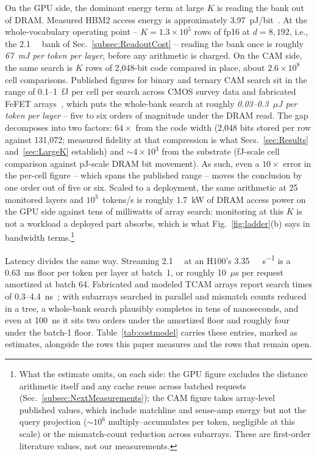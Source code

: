 \documentclass[conference]{IEEEtran}
\newcommand{\cam}{{CAM}\xspace}
\newcommand{\fefet}{{FeFET}\xspace}
\begin{document}
On the GPU side, the dominant energy term at large $K$ is reading the
bank out of DRAM. Measured HBM2 access energy is approximately
3.97~pJ/bit~\cite{oconnor2017fgdram}. At the whole-vocabulary
operating point -- $K=1.3\!\times\!10^{5}$ rows of fp16 at $d=8{,}192$,
i.e., the \qty{2.1}{\giga\byte} bank of
Sec.~\ref{subsec:ReadoutCost} -- reading the bank once is roughly
\emph{67~mJ per token per layer}, before any arithmetic is charged. On
the \cam side, the same search is $K$ rows of 2{,}048-bit code compared
in place, about $2.6\!\times\!10^{8}$ cell comparisons. Published
figures for binary and ternary \cam search sit in the range of
0.1--1~fJ per cell per search across CMOS survey data and fabricated
\fefet arrays~\cite{pagiamtzis2006cam,ni2019fetcam,liu2022evacam},
which puts the whole-bank search at roughly \emph{0.03--0.3~$\mu$J per
token per layer} -- five to six orders of magnitude under the DRAM
read. The gap decomposes into two factors: $64\times$ from the code
width (2{,}048 bits stored per row against 131{,}072; measured
fidelity at that compression is what Secs.~\ref{sec:Results}
and~\ref{sec:LargeK} establish) and $\sim$$4\!\times\!10^{3}$ from the
substrate (fJ-scale cell comparison against pJ-scale DRAM bit
movement). As such, even a $10\times$ error in the per-cell figure --
which spans the published range -- moves the conclusion by one order
out of five or six. Scaled to a deployment, the same arithmetic at 25
monitored layers and $10^{3}$~tokens/s is roughly 1.7~kW of DRAM
access power on the GPU side against tens of milliwatts of array
search: monitoring at this $K$ is not a workload a deployed part
absorbs, which is what Fig.~\ref{fig:ladder}(b) says in bandwidth
terms.\footnote{What the estimate omits, on each side: the GPU figure
excludes the distance arithmetic itself and any cache reuse across
batched requests (Sec.~\ref{subsec:NextMeasurements}); the \cam figure
takes array-level published values, which include matchline and
sense-amp energy but not the query projection ($\sim$$10^{6}$
multiply--accumulates per token, negligible at this scale) or the
mismatch-count reduction across subarrays. These are first-order
literature values, not our measurements.}

Latency divides the same way. Streaming \qty{2.1}{\giga\byte} at an
H100's \qty{3.35}{\tera\byte\per\second} is a 0.63~ms floor per token
per layer at batch~1, or roughly 10~$\mu$s per request amortized at
batch 64. Fabricated and modeled TCAM arrays report search times of
0.3--4.4~ns~\cite{liu2022evacam,ni2019fetcam}; with subarrays searched
in parallel and mismatch counts reduced in a tree, a whole-bank search
plausibly completes in tens of nanoseconds, and even at 100~ns it sits
two orders under the amortized floor and roughly four under the
batch-1 floor. Table~\ref{tab:costmodel} carries these entries, marked
as estimates, alongside the rows this paper measures and the rows that
remain open.
\end{document}

